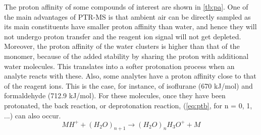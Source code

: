 The proton affinity of some compounds of interest are shown in \autoref{tb:pa}. One of the main advantages of PTR-MS is that ambient air can be directly sampled as its main constituents have smaller proton affinity than water, %
and hence they will not undergo proton transfer and the reagent ion signal will not get depleted.
Moreover, the proton affinity of the water clusters is higher than that of the monomer, because of the added stability by sharing the proton with additional water molecules.
This translates into a softer protonation process when an analyte reacts with these. 
%
Also, some analytes have a proton affinity close to that of the reagent ions.
This is the case, for instance, of isoflurane (670 kJ/mol) and formaldehyde (712.9 kJ/mol).
For these molecules, once they have been protonated,  the back reaction, or deprotonation reaction, (\autoref{eq:ptb}, for n = 0, 1, ...) can also occur.
\begin{equation}
\label{eq:ptb}
MH^+ + (H_2O)_{n+1} \rightarrow (H_2O)_{n}H_3O^+ + M
\end{equation}




